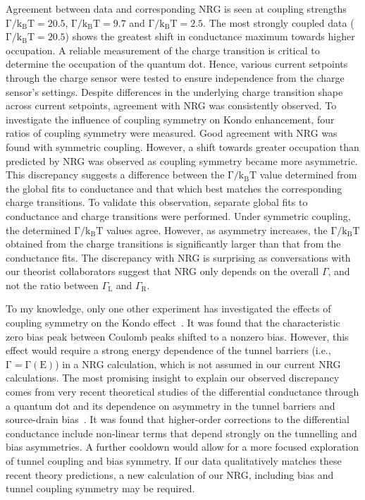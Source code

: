 Agreement between data and corresponding NRG is seen at coupling strengths $\mathrm{\Gamma/k_BT} = 20.5$, $\mathrm{\Gamma/k_BT} = 9.7$ and $\mathrm{\Gamma/k_BT} = 2.5$. The most strongly coupled data ($\mathrm{\Gamma/k_BT} = 20.5$) shows the greatest shift in conductance maximum towards higher occupation. 
A reliable measurement of the charge transition is critical to determine the occupation of the quantum dot. 
Hence, various current setpoints through the charge sensor were tested to ensure independence from the charge sensor's settings.
Despite differences in the underlying charge transition shape across current setpoints, agreement with NRG was consistently observed.
To investigate the influence of coupling symmetry on Kondo enhancement, four ratios of coupling symmetry were measured.
Good agreement with NRG was found with symmetric coupling. 
However, a shift towards greater occupation than predicted by NRG was observed as coupling symmetry became more asymmetric.
This discrepancy suggests a difference between the $\mathrm{\Gamma/k_BT}$ value determined from the global fits to conductance and that which best matches the corresponding charge transitions. 
To validate this observation, separate global fits to conductance and charge transitions were performed. Under symmetric coupling, the determined $\mathrm{\Gamma/k_BT}$ values agree. However, as asymmetry increases, the $\mathrm{\Gamma/k_BT}$ obtained from the charge transitions is significantly larger than that from the conductance fits.
The discrepancy with NRG is surprising as conversations with our theorist collaborators suggest that NRG only depends on the overall $\Gamma$, and not the ratio between $\Gamma_\mathrm{L}$ and $\Gamma_\mathrm{R}$.

To my knowledge, only one other experiment has investigated the effects of coupling symmetry on the Kondo effect~\cite{kondo_asymmetric}. 
It was found that the characteristic zero bias peak between Coulomb peaks shifted to a nonzero bias. However, this effect would require a strong energy dependence of the tunnel barriers (i.e., $\mathrm{\Gamma = \Gamma(E)}$) in a NRG calculation, which is not assumed in our current NRG calculations.
 The most promising insight to explain our observed discrepancy comes from very recent theoretical studies of the differential conductance through a quantum dot and its dependence on asymmetry in the tunnel barriers and source-drain bias~\cite{Tsutsumi2021,kondo_nrg_asymmetric}. 
 It was found that higher-order corrections to the differential conductance include non-linear terms that depend strongly on the tunnelling and bias asymmetries. A further cooldown would allow for a more focused exploration of tunnel coupling and bias symmetry. If our data qualitatively matches these recent theory predictions, a new calculation of our NRG, including bias and tunnel coupling symmetry may be required. 



